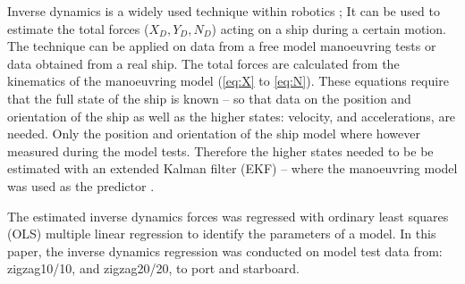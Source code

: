 Inverse dynamics is a widely used technique within robotics \citep{faber_inverse_2018}; It can be used to estimate the total forces ($X_D,Y_D,N_D$) acting on a ship during a certain motion. The technique can be applied on data from a free model manoeuvring tests or data obtained from a real ship. The total forces are calculated from the kinematics of the manoeuvring model (\autoref{eq:X} to \autoref{eq:N}). These equations require that the full state of the ship is known -- so that data on the position and orientation of the ship as well as the higher states: velocity, and accelerations, are needed.
Only the position and orientation of the ship model where however measured during the model tests.
Therefore the higher states needed to be be estimated with an extended Kalman filter (EKF) -- where the manoeuvring model was used as the predictor \citep{alexandersson_wpcc_2022}.

The estimated inverse dynamics forces was regressed with ordinary least squares (OLS) multiple
linear regression to identify the parameters of a model. In this paper, the inverse dynamics regression was conducted on model test data from: zigzag10/10, and zigzag20/20, to port and starboard.  